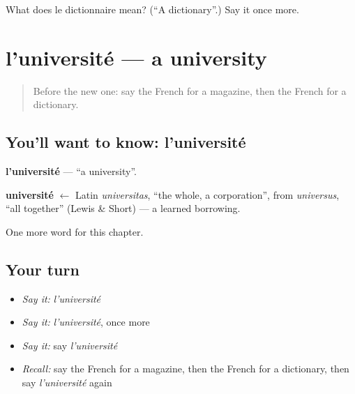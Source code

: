 \begin{tcolorbox}[breakable,colback=teal!4,colframe=teal!35!black,title={Before you move on}]
What does le dictionnaire mean? (\textquotedblleft{}A dictionary\textquotedblright{}.) Say it once more.
\end{tcolorbox}
\section[l'université]{l'université — a university}

\label{lesson:FR-C232-universite}



\begin{quote}
Before the new one: say the French for a magazine, then the French for a dictionary.
\end{quote}

\subsection*{You'll want to know: l'université}
\textbf{l'université} — \textquotedblleft{}a university\textquotedblright{}.

\begin{cousinweb}
\textbf{université} $\leftarrow$ Latin \emph{universitas}, \textquotedblleft{}the whole, a corporation\textquotedblright{}, from \emph{universus}, \textquotedblleft{}all together\textquotedblright{} (Lewis \& Short) — a learned borrowing.
\end{cousinweb}

\begin{grammarlens}[title={What you've built}]
One more word for this chapter.
\end{grammarlens}

\subsection*{Your turn}
\begin{itemize}
\raggedright
  \item \emph{Say it:} \emph{l'université}
  \item \emph{Say it:} \emph{l'université}, once more
  \item \emph{Say it:} say \emph{l'université}
  \item \emph{Recall:} say the French for a magazine, then the French for a dictionary, then say \emph{l'université} again
\end{itemize}

